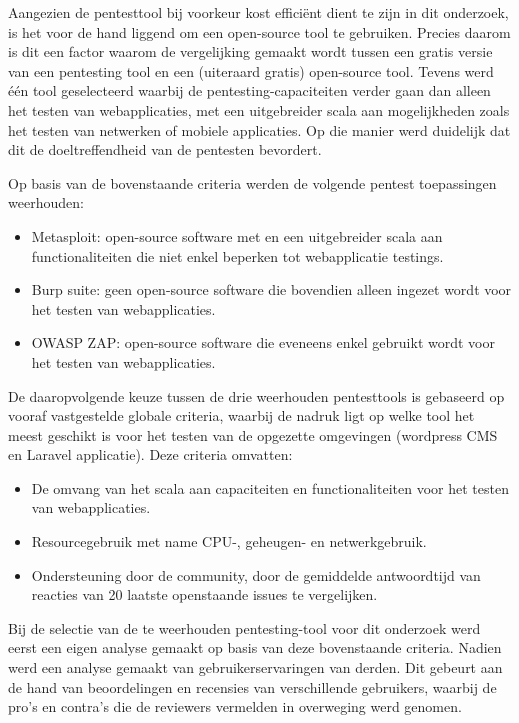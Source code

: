 Aangezien de pentesttool bij voorkeur kost efficiënt dient te zijn in dit onderzoek, is het voor de hand liggend om een open-source tool te gebruiken. Precies daarom 
is dit een factor waarom de vergelijking gemaakt wordt tussen een gratis versie van een pentesting tool en een (uiteraard gratis) open-source tool. 
Tevens werd één tool geselecteerd waarbij de pentesting-capaciteiten verder gaan dan alleen het testen van webapplicaties, met een 
uitgebreider scala aan mogelijkheden zoals het testen van netwerken of mobiele applicaties. Op die manier werd duidelijk dat dit 
de doeltreffendheid van de pentesten bevordert.

Op basis van de bovenstaande criteria werden de volgende pentest toepassingen weerhouden:
\begin{itemize}
    \item Metasploit: open-source software met en een uitgebreider scala aan functionaliteiten die niet enkel beperken tot webapplicatie testings.
    \item Burp suite: geen open-source software die bovendien alleen ingezet wordt voor het testen van webapplicaties.
    \item OWASP ZAP: open-source software die eveneens enkel gebruikt wordt voor het testen van webapplicaties.
\end{itemize}

De daaropvolgende keuze tussen de drie weerhouden pentesttools is gebaseerd op vooraf vastgestelde globale criteria, waarbij de nadruk ligt op welke tool het meest 
geschikt is voor het testen van de opgezette omgevingen (wordpress CMS en Laravel applicatie). Deze criteria omvatten:
\begin{itemize}
    \item De omvang van het scala aan capaciteiten en functionaliteiten voor het testen van webapplicaties.
    \item Resourcegebruik met name CPU-, geheugen- en netwerkgebruik.
    \item Ondersteuning door de community, door de gemiddelde antwoordtijd van reacties van 20 laatste openstaande issues te vergelijken.
\end{itemize}

Bij de selectie van de te weerhouden pentesting-tool voor dit onderzoek werd eerst een eigen analyse gemaakt op basis van deze bovenstaande criteria. 
Nadien werd een analyse gemaakt van gebruikerservaringen van derden. Dit gebeurt aan de hand van beoordelingen en recensies van 
verschillende gebruikers, waarbij de pro's en contra's die de reviewers vermelden in overweging werd genomen. 

